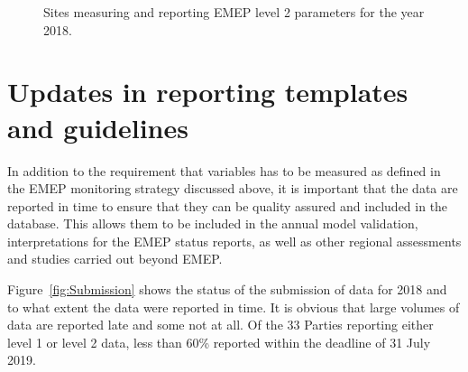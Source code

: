 \begin{figure}[h!]
 \centering
\caption{\label{fig:levell2-sites}Sites measuring and reporting EMEP level 2 parameters for the year 2018.}
\end{figure}

\section{Updates in reporting templates and guidelines}

In addition to the requirement that variables has to be measured as defined in the EMEP monitoring 
strategy discussed above, it is important that the data are reported in time to ensure that they can 
be quality assured and included in the database. This allows them to be included in the annual model 
validation, interpretations for the EMEP status reports, as well as other regional assessments and 
studies carried out beyond EMEP.

Figure~\ref{fig:Submission} shows the status of the submission of data for 2018 and to what  extent the data were reported in time. It is obvious that large volumes of data are reported late and some not at all. Of the 33 Parties reporting either level 1 or level 2 data, less than 60\% reported within the deadline of 31 July 2019. 

